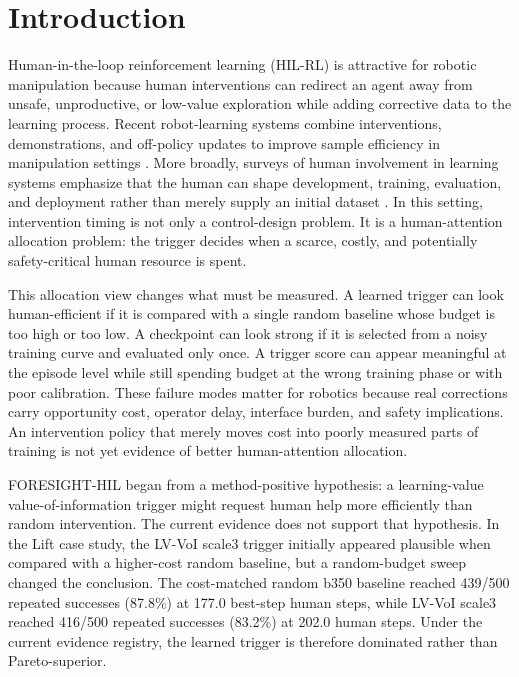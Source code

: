 \section{Introduction}

Human-in-the-loop reinforcement learning (HIL-RL) is attractive for robotic manipulation because human interventions can redirect an agent away from unsafe, unproductive, or low-value exploration while adding corrective data to the learning process. Recent robot-learning systems combine interventions, demonstrations, and off-policy updates to improve sample efficiency in manipulation settings \cite{luo2025hilserl,ball2023rlpd}. More broadly, surveys of human involvement in learning systems emphasize that the human can shape development, training, evaluation, and deployment rather than merely supply an initial dataset \cite{retzlaff2024hitl}. In this setting, intervention timing is not only a control-design problem. It is a human-attention allocation problem: the trigger decides when a scarce, costly, and potentially safety-critical human resource is spent.

This allocation view changes what must be measured. A learned trigger can look human-efficient if it is compared with a single random baseline whose budget is too high or too low. A checkpoint can look strong if it is selected from a noisy training curve and evaluated only once. A trigger score can appear meaningful at the episode level while still spending budget at the wrong training phase or with poor calibration. These failure modes matter for robotics because real corrections carry opportunity cost, operator delay, interface burden, and safety implications. An intervention policy that merely moves cost into poorly measured parts of training is not yet evidence of better human-attention allocation.

FORESIGHT-HIL began from a method-positive hypothesis: a learning-value value-of-information trigger might request human help more efficiently than random intervention. The current evidence does not support that hypothesis. In the Lift case study, the LV-VoI scale3 trigger initially appeared plausible when compared with a higher-cost random baseline, but a random-budget sweep changed the conclusion. The cost-matched random b350 baseline reached 439/500 repeated successes (87.8\%) at 177.0 best-step human steps, while LV-VoI scale3 reached 416/500 repeated successes (83.2\%) at 202.0 human steps. Under the current evidence registry, the learned trigger is therefore dominated rather than Pareto-superior.

